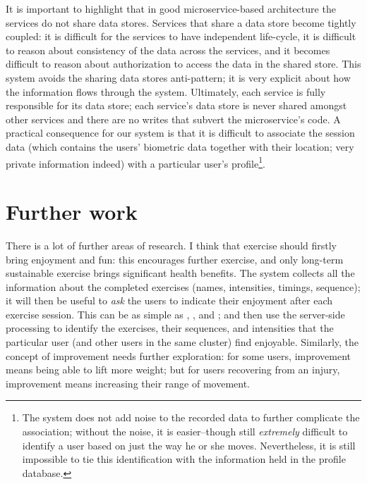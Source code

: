 It is important to highlight that in good microservice-based architecture the services do not share data stores. Services that share a data store become tightly coupled: it is difficult for the services to have independent life-cycle, it is difficult to reason about consistency of the data across the services, and it becomes difficult to reason about authorization to access the data in the shared store.
This system avoids the sharing data stores anti-pattern; it is very explicit about how the information flows through the system. Ultimately, each service is fully responsible for its data store; each service's data store is never shared amongst other services and there are no writes that subvert the microservice's code.
A practical consequence for our system is that it is difficult to associate the session data (which contains the users' biometric data together with their location; very private information indeed) with a particular user's profile\footnote{The system does not add noise to the recorded data to further complicate the association; without the noise, it is easier--though still \emph{extremely} difficult to identify a user based on just the way he or she moves. Nevertheless, it is still impossible to tie this identification with the information held in the profile database.}. 

\section{Further work}
There is a lot of further areas of research. I think that exercise should firstly bring enjoyment and fun: this encourages further exercise, and only long-term sustainable exercise brings significant health benefits. The system collects all the information about the completed exercises (names, intensities, timings, sequence); it will then be useful to \emph{ask} the users to indicate their enjoyment after each exercise session. This can be as simple as \smiley{}, \neutranie{}, and \frownie{}; and then use the server-side processing to identify the exercises, their sequences, and intensities that the particular user (and other users in the same cluster) find enjoyable. Similarly, the concept of improvement needs further exploration: for some users, improvement means being able to lift more weight; but for users recovering from an injury, improvement means increasing their range of movement.

\printbibliography

 